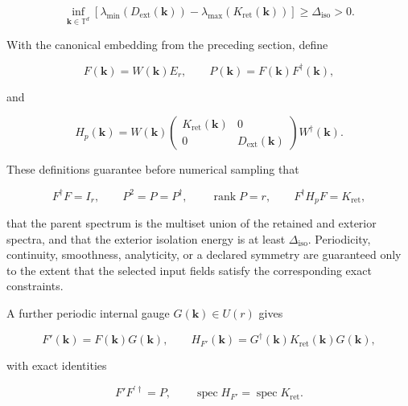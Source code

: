 \documentclass[11pt]{article}
\begin{document}
\begin{equation}
 \inf_{\mathbf k\in\mathbb T^d}
 \left[
 \lambda_{\min}(D_{\mathrm{ext}}(\mathbf k))
 -\lambda_{\max}(K_{\mathrm{ret}}(\mathbf k))
 \right]
 \geq\Delta_{\mathrm{iso}}>0.
 \label{eq:general-construction-gap}
\end{equation}

With the canonical embedding from the preceding section, define

\begin{equation}
 F(\mathbf k)=W(\mathbf k)E_r,
 \qquad
 P(\mathbf k)=F(\mathbf k)F^\dagger(\mathbf k),
 \label{eq:general-construction-frame}
\end{equation}

and

\begin{equation}
 H_p(\mathbf k)=W(\mathbf k)
 \begin{pmatrix}
 K_{\mathrm{ret}}(\mathbf k)&0\\
 0&D_{\mathrm{ext}}(\mathbf k)
 \end{pmatrix}
 W^\dagger(\mathbf k).
 \label{eq:general-construction-parent}
\end{equation}

These definitions guarantee before numerical sampling that

\begin{equation}
 F^\dagger F=I_r,
 \qquad
 P^2=P=P^\dagger,
 \qquad
 \operatorname{rank}P=r,
 \qquad
 F^\dagger H_pF=K_{\mathrm{ret}},
 \label{eq:general-construction-guarantees}
\end{equation}

that the parent spectrum is the multiset union of the retained and exterior spectra,
and that the exterior isolation energy is at least $\Delta_{\mathrm{iso}}$. Periodicity,
continuity, smoothness, analyticity, or a declared symmetry are guaranteed only to the
extent that the selected input fields satisfy the corresponding exact constraints.

A further periodic internal gauge $G(\mathbf k)\in U(r)$ gives

\begin{equation}
 F'(\mathbf k)=F(\mathbf k)G(\mathbf k),
 \qquad
 H_{F'}(\mathbf k)=G^\dagger(\mathbf k)
 K_{\mathrm{ret}}(\mathbf k)G(\mathbf k),
 \label{eq:general-construction-gauge}
\end{equation}

with exact identities

\begin{equation}
 F'F^{\prime\dagger}=P,
 \qquad
 \operatorname{spec}H_{F'}=\operatorname{spec}K_{\mathrm{ret}}.
 \label{eq:general-construction-gauge-guarantees}
\end{equation}
\end{document}
